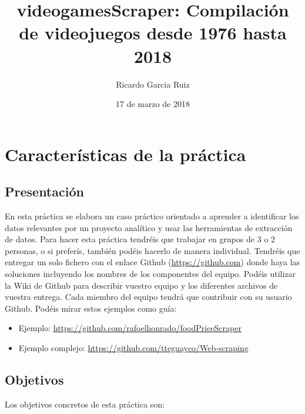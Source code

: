 \documentclass[]{article}
\title{videogamesScraper: Compilación de videojuegos desde 1976 hasta 2018}
\author{Ricardo Garcia Ruiz}
\date{17 de marzo de 2018}
\providecommand{\tightlist}{%
  \setlength{\itemsep}{0pt}\setlength{\parskip}{0pt}}
\begin{document}
\maketitle

{
\setcounter{tocdepth}{3}
\tableofcontents
}
\section{Características de la
práctica}\label{caracteristicas-de-la-practica}

\subsection{Presentación}\label{presentacion}

En esta práctica se elabora un caso práctico orientado a aprender a
identificar los datos relevantes por un proyecto analítico y usar las
herramientas de extracción de datos. Para hacer esta práctica tendréis
que trabajar en grupos de 3 o 2 personas, o si preferís, también podéis
hacerlo de manera individual. Tendréis que entregar un solo fichero con
el enlace Github (\url{https://github.com}) donde haya las soluciones
incluyendo los nombres de los componentes del equipo. Podéis utilizar la
Wiki de Github para describir vuestro equipo y los diferentes archivos
de vuestra entrega. Cada miembro del equipo tendrá que contribuir con su
usuario Github. Podéis mirar estos ejemplos como guía:

\begin{itemize}
\tightlist
\item
  Ejemplo: \url{https://github.com/rafoelhonrado/foodPriceScraper}
\item
  Ejemplo complejo: \url{https://github.com/tteguayco/Web-scraping}
\end{itemize}

\subsection{Objetivos}\label{objetivos}

Los objetivos concretos de esta práctica son:
\end{document}
